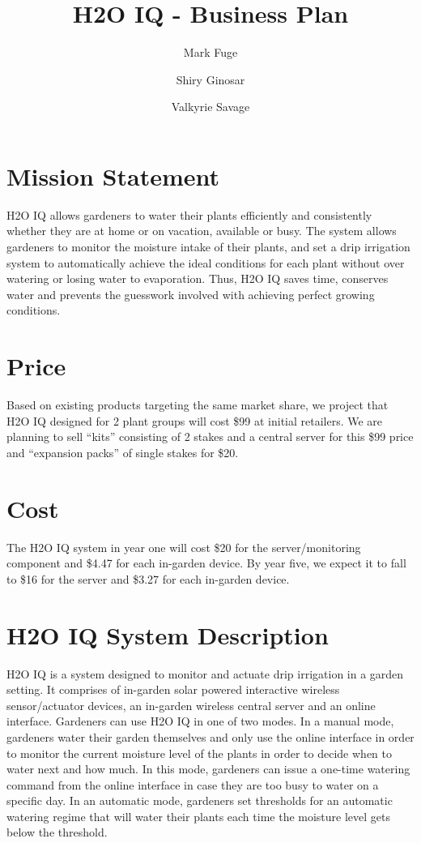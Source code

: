\documentclass[11pt]{article}
\begin{document}
\title{H2O IQ - Business Plan}
\author{Mark Fuge \and Shiry Ginosar \and Valkyrie Savage}

\maketitle

\section{Mission Statement}

H2O IQ allows gardeners to water their plants efficiently and consistently whether they are at home or on vacation, available or busy. The system allows gardeners to monitor the moisture intake of their plants, and set a drip irrigation system to automatically achieve the ideal conditions for each plant without over watering or losing water to evaporation. Thus, H2O IQ saves time, conserves water and prevents the guesswork involved with achieving perfect growing conditions.

\section{Price}

Based on existing products targeting the same market share, we project that H2O IQ designed for 2 plant groups will cost \$99 at initial retailers.  We are planning to sell ``kits'' consisting of 2 stakes and a central server for this \$99 price and ``expansion packs'' of single stakes for \$20.

\section{Cost}

The H2O IQ system in year one will cost \$20 for the server/monitoring component and \$4.47 for each in-garden device.  By year five, we expect it to fall to \$16 for the server and \$3.27 for each in-garden device.

\section{H2O IQ System Description}

H2O IQ is a system designed to monitor and actuate drip irrigation in a garden setting. It comprises of in-garden solar powered interactive wireless sensor/actuator devices, an in-garden wireless central server and an online interface. Gardeners can use H2O IQ in one of two modes. In a manual mode, gardeners water their garden themselves and only use the online interface in order to monitor the current moisture level of the plants in order to decide when to water next and how much. In this mode, gardeners can issue a one-time watering command from the online interface in case they are too busy to water on a specific day. In an automatic mode, gardeners set thresholds for an automatic watering regime that will water their plants each time the moisture level gets below the threshold.
\end{document}
